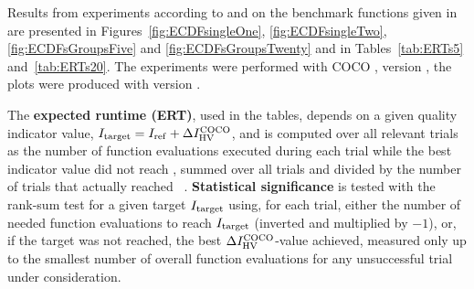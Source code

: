 \documentclass[sigconf]{acmart}
\begin{document}
Results from experiments according to \cite{hansen2016exp} and
\cite{hansen2022anytime} on the benchmark
functions given in \cite{biobj2022func} are presented in
Figures~\ref{fig:ECDFsingleOne}, \ref{fig:ECDFsingleTwo}, \ref{fig:ECDFsGroupsFive} and
\ref{fig:ECDFsGroupsTwenty} and in Tables~\ref{tab:ERTs5} and~\ref{tab:ERTs20}.
The experiments were performed with COCO \cite{hansen2020cocoplat}, version
\change{\version}, the plots were produced with version \change{\version}.

The \textbf{expected runtime (ERT)}, used in the %
tables,
depends on a given quality indicator value, $I_\mathrm{target}=I_\mathrm{ref}+\Delta I_{\mathrm{HV}}^{\mathrm{COCO}}$, and is
computed over all relevant trials as the number of function
evaluations executed during each trial while the best indicator value
did not reach \Itarget, summed over all trials and divided by the
number of trials that actually reached \Itarget\
\cite{hansen2022anytime,price1997dev}.  \textbf{Statistical significance}
is tested with the rank-sum test for a given target $I_\mathrm{target}$
using, for each trial,
either the number of needed function evaluations to reach
$I_\mathrm{target}$ (inverted and multiplied by $-1$), or, if the target
was not reached, the best $\Delta I_{\mathrm{HV}}^{\mathrm{COCO}}$-value achieved, measured only up to
the smallest number of overall function evaluations for any
unsuccessful trial under consideration.




\end{document}
